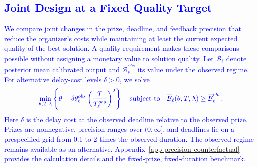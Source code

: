 \subsection{\textcolor{blue}{Joint Design at a Fixed Quality Target}}\label{sect-precision-design}

\textcolor{blue}{We compare joint changes in the prize, deadline, and feedback precision that reduce the organizer's costs while maintaining at least the current expected quality of the best solution. A quality requirement makes these comparisons possible without assigning a monetary value to solution quality. Let $\overline{\mathcal B}_\ell$ denote posterior mean calibrated output and $\overline{\mathcal B}_\ell^{obs}$ its value under the observed regime. For alternative delay-cost levels $\delta>0$, we solve}
\begin{equation}\label{eq-empirical-joint-design}
\textcolor{blue}{\min_{\theta,T,\lambda}\left\{\theta+\delta\theta_\ell^{obs}\left(\frac{T}{T_\ell^{obs}}\right)^2\right\}
\quad\text{subject to}\quad
\overline{\mathcal B}_\ell(\theta,T,\lambda)\geq\overline{\mathcal B}_\ell^{obs}.}
\end{equation}
\textcolor{blue}{Here $\delta$ is the delay cost at the observed deadline relative to the observed prize. Prizes are nonnegative, precision ranges over $(0,\infty]$, and deadlines lie on a prespecified grid from 0.1 to 2 times the observed duration. The observed regime remains available as an alternative. Appendix~\ref{app-precision-counterfactual} provides the calculation details and the fixed-prize, fixed-duration benchmark.}

